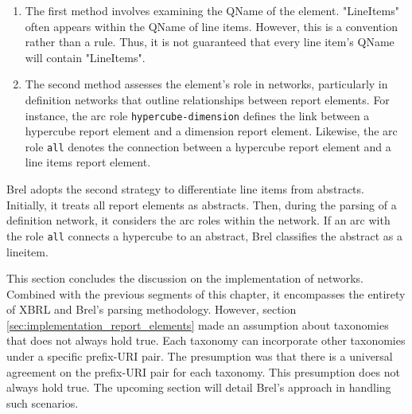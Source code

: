 \begin{enumerate}
\item The first method involves examining the QName of the element.
"LineItems" often appears within the QName of line items.
However, this is a convention rather than a rule.
Thus, it is not guaranteed that every line item's QName will contain "LineItems".
\item The second method assesses the element's role in networks, particularly in definition networks that outline relationships between report elements.
For instance, the arc role \texttt{hypercube-dimension} defines the link between a hypercube report element and a dimension report element.
Likewise, the arc role \texttt{all} denotes the connection between a hypercube report element and a line items report element.
\end{enumerate}

Brel adopts the second strategy to differentiate line items from abstracts.
Initially, it treats all report elements as abstracts.
Then, during the parsing of a definition network, it considers the arc roles within the network.
If an arc with the role \texttt{all} connects a hypercube to an abstract, Brel classifies the abstract as a lineitem.

This section concludes the discussion on the implementation of networks.
Combined with the previous segments of this chapter, it encompasses the entirety of XBRL and Brel's parsing methodology.
However, section \ref{sec:implementation_report_elements} made an assumption about taxonomies that does not always hold true.
Each taxonomy can incorporate other taxonomies under a specific prefix-URI pair.
The presumption was that there is a universal agreement on the prefix-URI pair for each taxonomy.
This presumption does not always hold true.
The upcoming section will detail Brel's approach in handling such scenarios.